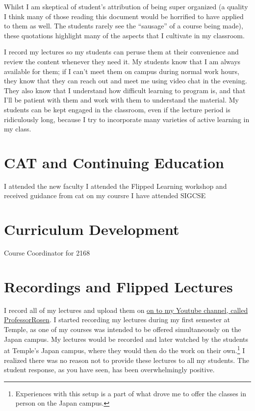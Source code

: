 \documentclass[10pt]{article}
\begin{document}
Whilst I am skeptical of student's attribution of being super organized (a quality I think many of those reading this document would be horrified to have applied to them as well.  The students rarely see the ``sausage'' of a course being made), these quotations highlight many of the aspects that I cultivate in my classroom.  


I record my lectures so my students can peruse them at their convenience and review the content whenever they need it.  
My students know that I am always available for them; if I can't meet them on campus during normal work hours, they know that they can reach out and meet me using video chat in the evening.
They also know that I understand how difficult learning to program is, and that I'll be patient with them and work with them to understand the material.
My students can be kept engaged in the classroom, even if the lecture period is ridiculously long, because I try to incorporate many varieties of active learning in my class.


\section{CAT and Continuing Education}


I attended the new faculty
I attended the Flipped Learning workshop and received guidance from cat on my coursre
I have attended SIGCSE
\section{Curriculum Development}
Course Coordinator for 2168



\section{Recordings and Flipped Lectures}

I record all of my lectures and upload them on \href{https://www.youtube.com/channel/professorrosen}{on to my Youtube channel, called ProfessorRosen}.  
I started recording my lectures during my first semester at Temple, as one of my courses was intended to be offered simultaneously on the Japan campus.  My lectures would be recorded and later watched by the students at Temple's Japan campus, where they would then do the work on their own.\footnote{Experiences with this setup is a part of what drove me to offer the classes in person on the Japan campus.}
I realized there was no reason not to provide these lectures to all my students.
The student response, as you have seen, has been overwhelmingly positive.
\end{document}
